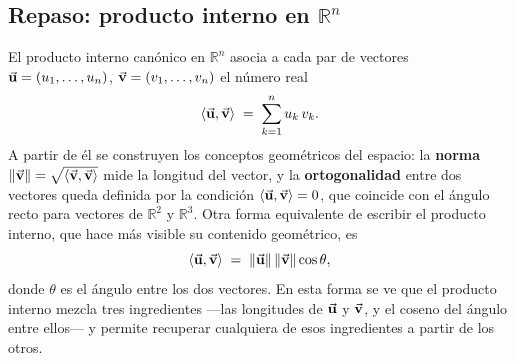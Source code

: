 \documentclass[class=book, crop=false]{standalone}
\begin{document}
\subsection{Repaso: producto interno en \texorpdfstring{$\mathbb{R}^n$}{R\textasciicircum n}}
\label{subsec:repaso_producto_interno}

El producto interno canónico en $\mathbb{R}^n$ asocia a cada par de vectores
$\vec{\mathbf{u}} = (u_1,\ldots,u_n)$, $\vec{\mathbf{v}} = (v_1,\ldots,v_n)$ el número
real
\begin{equation}
    \langle \vec{\mathbf{u}},\vec{\mathbf{v}}\rangle \;=\; \sum_{k=1}^{n} u_k\,v_k.
    \label{eq:pi_Rn}
\end{equation}
A partir de él se construyen los conceptos geométricos del espacio: la
\textbf{norma} $\|\vec{\mathbf{v}}\| = \sqrt{\langle\vec{\mathbf{v}},\vec{\mathbf{v}}\rangle}$
mide la longitud del vector, y la \textbf{ortogonalidad} entre dos
vectores queda definida por la condición $\langle\vec{\mathbf{u}},\vec{\mathbf{v}}\rangle = 0$,
que coincide con el ángulo recto para vectores de $\mathbb{R}^2$ y $\mathbb{R}^3$. 
Otra forma equivalente de escribir el producto interno, que hace más visible su contenido geométrico, es
\begin{equation}
    \langle \vec{\mathbf{u}},\vec{\mathbf{v}}\rangle \;=\; \|\vec{\mathbf{u}}\|\,\|\vec{\mathbf{v}}\|\cos\theta,
    \label{eq:pi_Rn_angulo}
\end{equation}
donde $\theta$ es el ángulo entre los dos vectores. En esta forma se ve que el producto interno mezcla tres ingredientes —las longitudes de $\vec{\mathbf{u}}$ y $\vec{\mathbf{v}}$, y el coseno del ángulo entre ellos— y permite recuperar cualquiera de esos ingredientes a partir de los otros.
\end{document}
